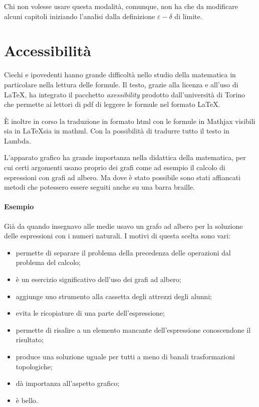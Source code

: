 \documentclass[a4paper,10pt]{article}
\renewcommand{\epsilon}{\varepsilon}
\begin{document}
\vspace{1em}
Chi non volesse usare questa modalità, comunque, non ha che da modificare 
alcuni capitoli iniziando l'analisi dalla definizione \(\epsilon - \delta\) 
di limite.

\section{Accessibilità}

Ciechi e ipovedenti hanno grande difficoltà nello studio della matematica 
in particolare nella lettura delle formule.
Il testo, grazie alla licenza e all'uso di \LaTeX, ha integrato il pacchetto 
\emph{axessibility} prodotto dall'università di Torino che permette ai 
lettori di pdf di leggere le formule nel formato \LaTeX.

È inoltre in corso la traduzione in formato html con le formule in Mathjax 
visibili sia in \LaTeX sia in mathml. Con la possibilità di tradurre tutto il 
testo in Lambda.

L'apparato grafico ha grande importanza nella didattica della matematica, per 
cui certi argomenti usano proprio dei grafi come ad esempio il calcolo di 
espressioni con grafi ad albero.
Ma dove è stato possibile sono stati affiancati metodi che potessero essere 
seguiti anche su una barra braille.

\paragraph{Esempio} Già da quando insegnavo alle medie usavo un grafo ad 
albero per la soluzione delle espressioni con i numeri naturali. 
I motivi di questa scelta sono vari:

\begin{itemize} [noitemsep]
\item permette di separare il problema della precedenza delle operazioni dal 
problema del calcolo;
\item è un esercizio significativo dell'uso dei grafi ad albero;
\item aggiunge uno strumento alla cassetta degli attrezzi degli alunni;
\item evita le ricopiature di una parte dell'espressione;
\item permette di risalire a un elemento mancante dell'espressione 
conoscendone il risultato;
\item produce una soluzione uguale per tutti a meno di banali 
trasformazioni topologiche;
\item dà importanza all'aspetto grafico;
\item è bello.
\end{itemize}
\end{document}
